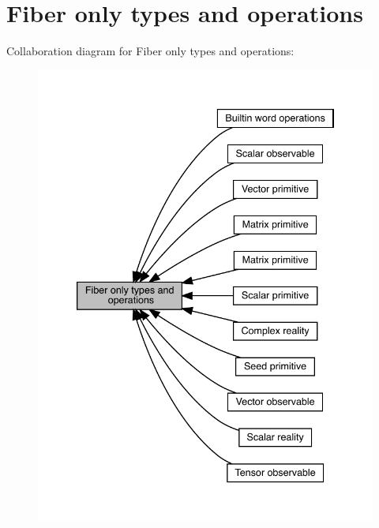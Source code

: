 \hypertarget{group__fiber}{}\section{Fiber only types and operations}
\label{group__fiber}
Collaboration diagram for Fiber only types and operations\+:\nopagebreak
\begin{figure}[H]
\begin{center}
\leavevmode
\includegraphics[width=339pt]{d6/d4f/group__fiber}
\end{center}
\end{figure}
